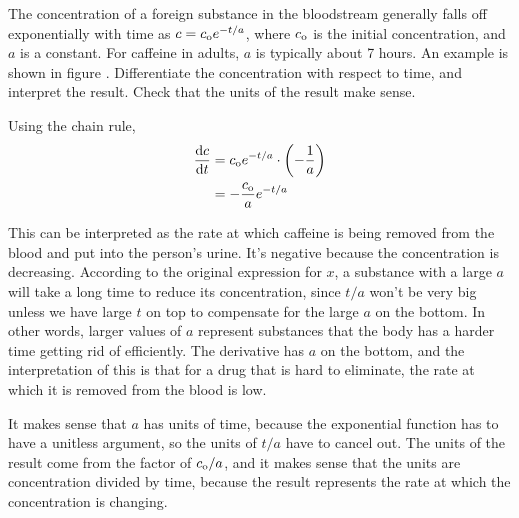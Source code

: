 \pagebreak[4]

\begin{eg}\label{eg:caffeine}
\egquestion The concentration of a foreign substance in the bloodstream generally falls off exponentially
with time as $c=c_{\textup{o}}e^{-t/a}$, where $c_{\textup{o}}$ is the initial concentration, and $a$ is a constant.
For caffeine in adults, $a$ is typically about 7 hours. An example is shown in figure . Differentiate the concentration with respect
to time, and interpret the result. Check that the units of the result make sense.

\eganswer Using the chain rule,
\begin{align*}
  \frac{\textup{d} c}{\textup{d} t} &= c_{\textup{o}}e^{-t/a}\cdot\left(-\frac{1}{a}\right) \\
                        &= -\frac{c_{\textup{o}}}{a}e^{-t/a}
\end{align*}

This can be interpreted as the rate at which caffeine is being removed from the blood and put into the person's urine. It's
negative because the concentration is decreasing.
According to the original expression for $x$, a substance with a large $a$ will take a long time to reduce its concentration,
since $t/a$ won't be very big unless we have large $t$ on top to compensate for the large $a$ on the bottom.
In other words, larger values of $a$ represent substances that the body has a harder time getting rid of efficiently.
The derivative has $a$ on the bottom, and the interpretation of this is that for a drug that is hard to eliminate,
the rate at which it is removed from the blood is low.

It makes sense that $a$ has units of time, because the exponential function has to have a unitless argument, so the units
of $t/a$ have to cancel out. The units of the result come from the factor of $c_{\textup{o}}/a$, and
it makes sense that the units are concentration divided by time, because the result
represents the rate at which the concentration is changing.
\end{eg}


